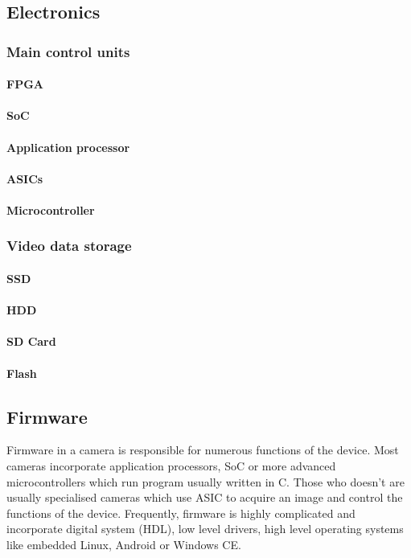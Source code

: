     \subsection{Electronics}
       \subsubsection{Main control units}
         \paragraph{FPGA}
         \paragraph{SoC}
         \paragraph{Application processor}
         \paragraph{ASICs}
         \paragraph{Microcontroller}

     \subsubsection{Video data storage}
         \paragraph{SSD}
         \paragraph{HDD}
         \paragraph{SD Card}
         \paragraph{Flash}

    \subsection{Firmware}
      Firmware in a camera is responsible for numerous functions of the device. Most cameras incorporate application
      processors, SoC or more advanced microcontrollers which run program usually written in C. Those who doesn't are usually
      specialised cameras which use ASIC to acquire an image and control the functions of the device. Frequently, firmware
      is highly complicated and incorporate digital system (HDL), low level drivers, high level operating systems like
      embedded Linux, Android or Windows CE.  

